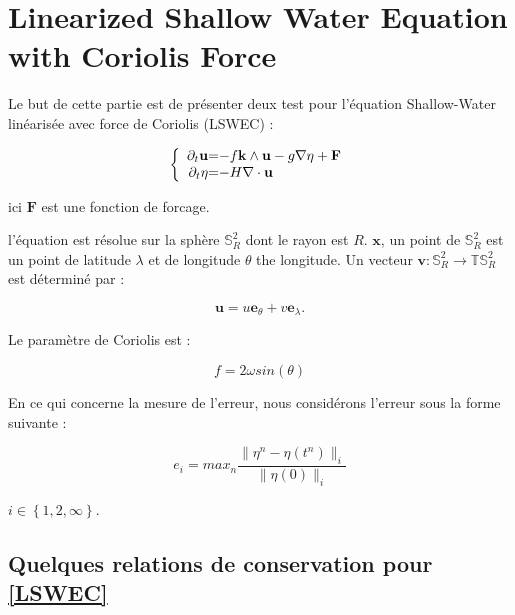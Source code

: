 \chapter{Linearized Shallow Water Equation with Coriolis Force}

Le but de cette partie est de présenter deux test pour l'équation Shallow-Water linéarisée avec force de Coriolis (LSWEC) :

\begin{equation}
\label{LSWEC}
\left\lbrace
\begin{array}{r @{=} l}
\partial_t \mathbf{u} & -f \mathbf{k} \wedge \mathbf{u} - g \nabla \eta + \mathbf{F} \\
\partial_t \eta & -H \nabla \cdot \mathbf{u} 
\end{array}
\right.
\end{equation}

ici $\mathbf{F}$ est une fonction de forcage.

l'équation est résolue sur la sphère $\mathbb{S}_R^2$ dont le rayon est $R$. $\mathbf{x}$, un point de $\mathbb{S}_R^2$ est un point de latitude $\lambda$ et de longitude $\theta$ the longitude. Un vecteur $\mathbf{v} : \mathbb{S}_R^2 \rightarrow \mathbb{T}\mathbb{S}_R^2$ est déterminé par :

$$\mathbf{u} = u \mathbf{e}_{\theta} + v \mathbf{e}_{\lambda}.$$ 

Le paramètre de Coriolis est :

\begin{equation}
f=2 \omega sin ( \theta )
\label{coriolis_parameter}
\end{equation}

En ce qui concerne la mesure de l'erreur, nous considérons l'erreur sous la forme suivante :

$$e_{i} = max_n \dfrac{\| \eta^n - \eta(t^n) \|_{i}}{\| \eta(0) \|_{i}}$$

$i \in \left\lbrace 1, 2, \infty \right\rbrace$.

\section{Quelques relations de conservation pour \eqref{LSWEC}}

